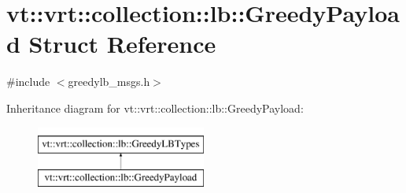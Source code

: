 \hypertarget{structvt_1_1vrt_1_1collection_1_1lb_1_1_greedy_payload}{}\section{vt\+:\+:vrt\+:\+:collection\+:\+:lb\+:\+:Greedy\+Payload Struct Reference}
\label{structvt_1_1vrt_1_1collection_1_1lb_1_1_greedy_payload}


{\ttfamily \#include $<$greedylb\+\_\+msgs.\+h$>$}

Inheritance diagram for vt\+:\+:vrt\+:\+:collection\+:\+:lb\+:\+:Greedy\+Payload\+:\begin{figure}[H]
\begin{center}
\leavevmode
\includegraphics[height=2.000000cm]{structvt_1_1vrt_1_1collection_1_1lb_1_1_greedy_payload}
\end{center}
\end{figure}
